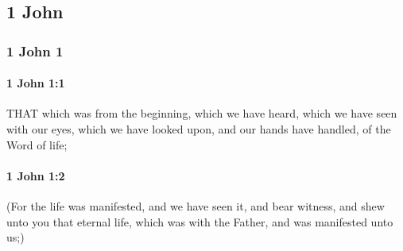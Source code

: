 \subsection{1 John}
	\label{1JOHN}
	
	\subsubsection{1 John 1} %
		\label{1JOHN-1}
		
		\paragraph{1 John 1:1} %
			\label{1JOHN-1-1}

			THAT which was from the beginning, which we have heard, which we have seen with our eyes, which we have looked upon, and our hands have handled, of the Word of life;

			\begin{framed}
			\scriptsize
				\begin{compactdesc}
					\item[SBLG] 
				\end{compactdesc}
			\end{framed}

		\paragraph{1 John 1:2} %
			\label{1JOHN-1-2}

			(For the life was manifested, and we have seen it, and bear witness, and shew unto you that eternal life, which was with the Father, and was manifested unto us;)

